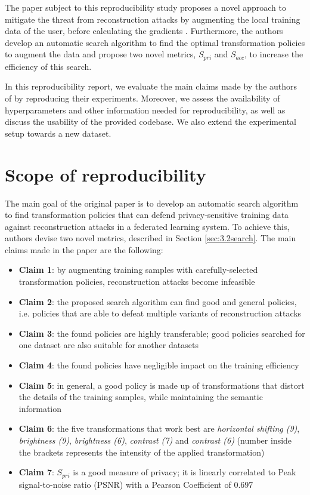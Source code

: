 The paper subject to this reproducibility study proposes a novel approach to mitigate the threat from reconstruction attacks by augmenting the local training data of the user, before calculating the gradients \cite{gao2021privacy}. Furthermore, the authors develop an automatic search algorithm to find the optimal transformation policies to augment the data and propose two novel metrics, $S_{pri}$ and $S_{acc}$, to increase the efficiency of this search.

In this reproducibility report, we evaluate the main claims made by the authors of \cite{gao2021privacy} by reproducing their experiments. Moreover, we assess the availability of hyperparameters and other information needed for reproducibility, as well as discuss the usability of the provided codebase. We also extend the experimental setup towards a new dataset.


\section{Scope of reproducibility}
\label{sec:claims}

The main goal of the original paper is to develop an automatic search algorithm to find transformation policies that can defend privacy-sensitive training data against reconstruction attacks in a federated learning system. To achieve this, authors devise two novel metrics, described in Section \ref{sec:3.2search}. The main claims made in the paper are the following:

\begin{itemize}[noitemsep,topsep=-3pt]
\itemsep0em 
\item \textbf{Claim 1}: by  augmenting training samples with carefully-selected transformation  policies,  reconstruction attacks become infeasible
\item \textbf{Claim 2}: the proposed search algorithm can find good and general policies, i.e. policies that are able to defeat multiple variants of reconstruction attacks
\item \textbf{Claim 3}: the found policies are highly transferable; good policies searched for one dataset are also suitable for another datasets
\item \textbf{Claim 4}: the found policies have negligible impact on the training efficiency
\item \textbf{Claim 5}: in general, a good policy is made up of transformations that distort the details of the training samples, while maintaining the semantic information
\item \textbf{Claim 6}: the five transformations that work best are \emph{horizontal shifting (9)}, \emph{brightness (9)}, \emph{brightness (6)}, \emph{contrast (7)} and \emph{contrast (6)} (number inside the brackets represents the intensity of the applied transformation)
\item \textbf{Claim 7}: $S_{pri}$ is a good measure of privacy; it is linearly correlated to Peak signal-to-noise ratio (PSNR) \cite{hore2010} with a Pearson Coefficient \cite{stigler1989} of $0.697$
\end{itemize}

